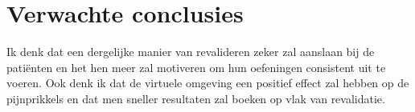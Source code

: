 \section{Verwachte conclusies}
\label{sec:verwachte_conclusies}

Ik denk dat een dergelijke manier van revalideren zeker zal aanslaan bij de patiënten en het hen meer zal motiveren om hun oefeningen consistent uit te voeren. Ook denk ik dat de virtuele omgeving een positief effect zal hebben op de pijnprikkels en dat men sneller resultaten zal boeken op vlak van revalidatie. 


